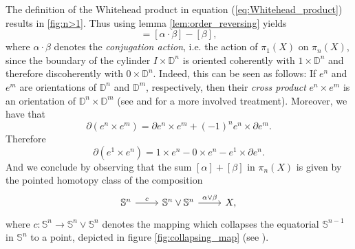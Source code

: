The definition of the Whitehead product in equation (\ref{eq:Whitehead_product}) results in \ref{fig:n>1}. Thus	using lemma \ref{lem:order_reversing} yields
\begin{equation*}
	[\alpha,\beta] = [\alpha \cdot \beta] - [\beta],
\end{equation*}
\noindent where $\alpha \cdot \beta$ denotes the \emph{conjugation action}, i.e. the action of $\pi_1(X)$ on $\pi_n(X)$, since the boundary of the cylinder $I \times \mathbb{D}^n$ is oriented coherently with $1 \times \mathbb{D}^n$ and therefore discoherently with $0 \times \mathbb{D}^n$. Indeed, this can be seen as follows: If $e^n$ and $e^m$ are orientations of $\mathbb{D}^n$ and $\mathbb{D}^m$, respectively, then their \emph{cross product} $e^n \times e^m$ is an orientation of $\mathbb{D}^n \times \mathbb{D}^m$ (see \cite[64]{whitehead:homotopy_theory:1978} and \cite[268--278]{hatcher:algebraic_topology:2001} for a more involved treatment). Moreover, we have that 
\begin{equation*}
	\partial(e^n \times e^m) = \partial e^n \times e^m + (-1)^n e^n \times \partial e^m.
\end{equation*}
Therefore
\begin{equation*}
	\partial(e^1 \times e^n) = 1 \times e^n - 0 \times e^n - e^1 \times \partial e^n.
\end{equation*}
And we conclude by observing that the sum $[\alpha] + [\beta]$ in $\pi_n(X)$ is given by the pointed homotopy class of the composition
\begin{equation*}
	\begin{tikzcd}
		\mathbb{S}^n \arrow[r,"c"] & \mathbb{S}^n \vee \mathbb{S}^n \arrow[r,"\alpha \vee \beta"] & X,
	\end{tikzcd}
\end{equation*}
\noindent where $c : \mathbb{S}^n \to \mathbb{S}^n \vee \mathbb{S}^n$ denotes the mapping which collapses the equatorial $\mathbb{S}^{n - 1}$ in $\mathbb{S}^n$ to a point, depicted in figure \ref{fig:collapsing_map} (see \cite[341]{hatcher:algebraic_topology:2001}).

